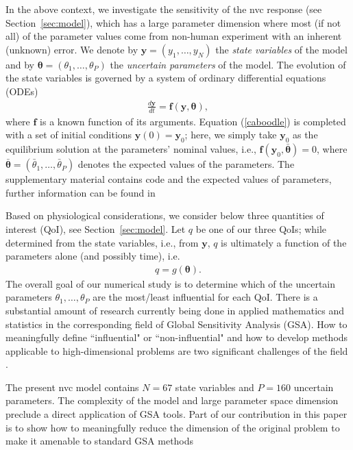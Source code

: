 In the above context, we investigate the sensitivity of  the \gls{nvc} response (see Section~\ref{sec:model}), which has a large parameter dimension where most (if not all) of the parameter values come from non-human experiment  with an inherent (unknown) error. We denote by $\mathbf y = (y_1, \dots, y_N)$  the {\sl state variables} of the model and by $\boldsymbol{\theta} = (\theta_1, \dots, \theta_P)$ the {\sl uncertain parameters} of the model. The evolution of the state variables is governed by a system of ordinary differential equations (ODEs) 
\begin{eqnarray}
\frac {d\boldsymbol{y}}{dt} = \mathbf{f}(\mathbf{y}, \boldsymbol{\theta}), \label{caboodle}
\end{eqnarray}
where $\mathbf{f}$ is a known function of its arguments. Equation (\ref{caboodle}) is completed with a set of initial conditions $\boldsymbol{y}(0) = \boldsymbol{y}_0$;  here, we simply take $\boldsymbol{y}_0$ as the  equilibrium solution at the parameters' nominal values, i.e., $\mathbf f(  \mathbf{y}_0, \bar{\boldsymbol{\theta}}) = 0$, where $ \bar{\boldsymbol{\theta}} = (\bar\theta_1, \dots, \bar\theta_P)$ denotes the expected values of the parameters. The supplementary material contains code and the expected values of parameters, further information can be found in \cite{Dormanns2015a}

Based on physiological considerations, we consider below three quantities of interest (QoI), see Section~\ref{sec:model}.  Let $q$ be one of our three  QoIs; while determined from the state variables, i.e., from $\mathbf y$, $q$ is  ultimately a function of the parameters alone (and possibly time), i.e.
\begin{eqnarray}
q = g(\boldsymbol{\theta}). \label{qoi}
\end{eqnarray}
The overall goal of our numerical study is to determine  which of the uncertain parameters $\theta_1, \dots, \theta_P$  are the most/least influential for each QoI. There is a substantial amount of research currently being done in applied mathematics and statistics in the corresponding field of Global Sensitivity Analysis  (GSA). How to meaningfully define ``influential" or ``non-influential" and  how to develop methods applicable to high-dimensional problems are two significant challenges of the field \cite{corvar,timegsa,stogsa,iooss,owen,saltelli}. 



The present \gls{nvc} model contains $N=67$ state variables and $P= 160$ uncertain parameters.
The complexity of the model and large parameter space dimension preclude a direct application of GSA tools. Part of our contribution in this paper is to show how to meaningfully reduce the dimension of the original problem to make it amenable to standard GSA methods

